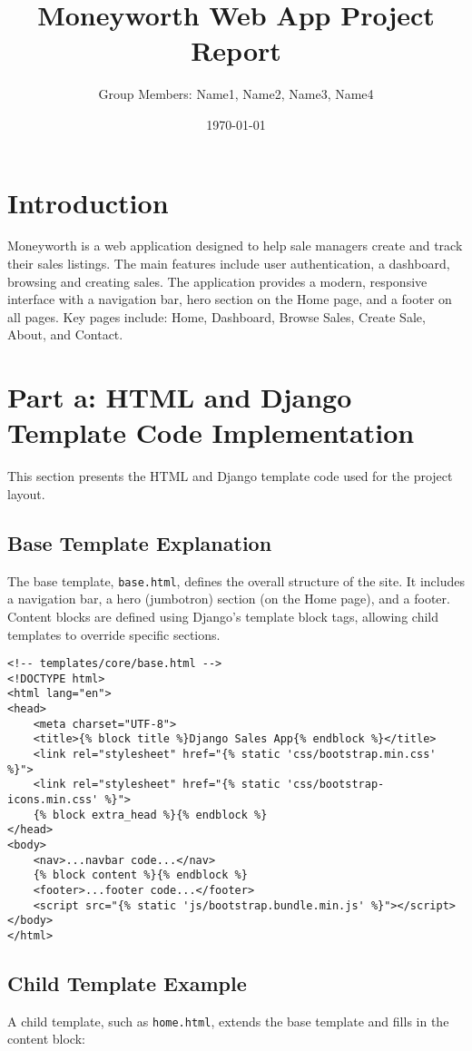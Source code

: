 \documentclass[12pt]{article}
\title{Moneyworth Web App Project Report}
\author{Group Members: Name1, Name2, Name3, Name4}
\date{\today}
\begin{document}
\maketitle

\section{Introduction}
Moneyworth is a web application designed to help sale managers 
create and track their sales listings.
The main features include user authentication, a dashboard,
browsing and creating sales. The application provides a 
modern, responsive interface with a navigation bar, 
hero section on the Home page, and a footer on all pages.
Key pages include:
 Home, Dashboard, Browse Sales, Create Sale,
 About, and Contact.

\section{Part a: HTML and Django Template Code Implementation}
This section presents the HTML and Django template code used 
for the project layout.

\subsection{Base Template Explanation}
The base template, \texttt{base.html}, defines the overall structure of the site. 
It includes a navigation bar, a hero (jumbotron) section (on the Home page), and a footer. 
Content blocks are defined using Django's template block tags, allowing child templates to 
override specific sections.

\begin{verbatim}
<!-- templates/core/base.html -->
<!DOCTYPE html>
<html lang="en">
<head>
    <meta charset="UTF-8">
    <title>{% block title %}Django Sales App{% endblock %}</title>
    <link rel="stylesheet" href="{% static 'css/bootstrap.min.css' %}">
    <link rel="stylesheet" href="{% static 'css/bootstrap-icons.min.css' %}">
    {% block extra_head %}{% endblock %}
</head>
<body>
    <nav>...navbar code...</nav>
    {% block content %}{% endblock %}
    <footer>...footer code...</footer>
    <script src="{% static 'js/bootstrap.bundle.min.js' %}"></script>
</body>
</html>
\end{verbatim}

\subsection{Child Template Example}
A child template, such as \texttt{home.html}, extends the base template and fills in the 
content block:
\end{document}
